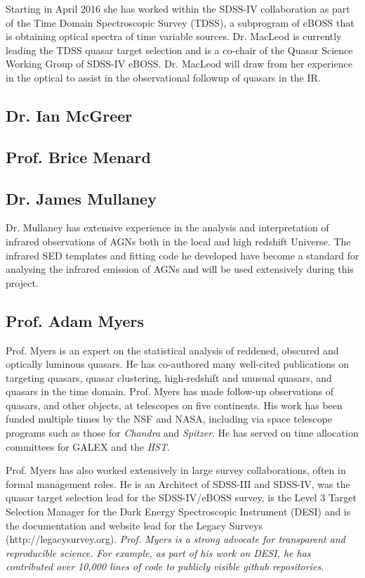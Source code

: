 \smallskip \smallskip \noindent
Starting in April 2016 she has worked within the SDSS-IV collaboration
as part of the Time Domain Spectroscopic Survey (TDSS), a subprogram
of eBOSS that is obtaining optical spectra of time variable sources.
Dr. MacLeod is currently leading the TDSS quasar target selection and
is a co-chair of the Quasar Science Working Group of SDSS-IV
eBOSS. Dr. MacLeod will draw from her experience in the optical to
assist in the observational followup of quasars in the IR.


\subsection*{Dr. Ian McGreer}


\subsection*{Prof. Brice Menard}	


\subsection*{Dr. James Mullaney}
Dr. Mullaney has extensive experience in the analysis and interpretation of infrared observations of AGNs both in the local and high redshift Universe. The infrared SED templates and fitting code he developed have become a standard for analysing the infrared emission of AGNs and will be used extensively during this project. 

\subsection*{Prof. Adam Myers}
Prof. Myers is an expert on the statistical analysis of reddened,
obscured and optically luminous quasars. He has co-authored many
well-cited publications on targeting quasars, quasar clustering,
high-redshift and unusual quasars, and quasars in the time
domain. Prof. Myers has made follow-up observations of quasars, and
other objects, at telescopes on five continents. His work has been
funded multiple times by the NSF and NASA, including via space
telescope programs such as those for {\it Chandra} and {\it Spitzer}. He has
served on time allocation committees for GALEX and the {\it HST}. 

\smallskip \smallskip
\noindent
Prof. Myers has also worked extensively in large survey
collaborations, often in formal management roles. He is an Architect
of SDSS-III and SDSS-IV, was the quasar target selection lead for the
SDSS-IV/eBOSS survey, is the Level 3 Target Selection Manager for the
Dark Energy Spectroscopic Instrument (DESI) and is the documentation
and website lead for the Legacy Surveys
(http://legacysurvey.org). {\it Prof. Myers is a strong advocate for
transparent and reproducible science. For example, as part of his work
on DESI, he has contributed over 10,000 lines of code to publicly
visible github repositories.}


